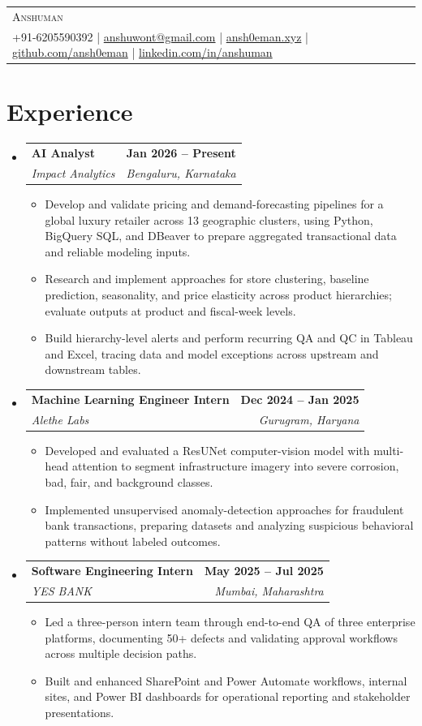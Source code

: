 \documentclass[letterpaper,11pt]{article}
\makeatletter
\newcommand{\resumeItem}[1]{
  \item\small{{#1 \vspace{-2pt}}}
}
\newcommand{\resumeSubheading}[4]{
  \vspace{-2pt}\item
    \begin{tabular*}{1.0\textwidth}[t]{l@{\extracolsep{\fill}}r}
      \textbf{#1} & \textbf{\small #2} \\
      \textit{\small #3} & \textit{\small #4} \\
    \end{tabular*}\vspace{-8pt}
}
\newcommand{\resumeSubHeadingListStart}{\begin{itemize}[leftmargin=0.0in,label={}]}
\newcommand{\resumeSubHeadingListEnd}{\end{itemize}}
\newcommand{\resumeItemListStart}{\begin{itemize}[leftmargin=0.22in]}
\newcommand{\resumeItemListEnd}{\end{itemize}\vspace{-6pt}}
\makeatother
\begin{document}
\begin{tabularx}{\textwidth}{@{}X@{}}
  {\Huge \scshape Anshuman}\\[0.2em]
  +91-6205590392 \;|\;
  \href{mailto:anshuwont@gmail.com}{anshuwont@gmail.com} \;|\;
  \href{https://ansh0eman.in/?utm_source=resume\&utm_medium=pdf\&utm_campaign=job_search\&utm_content=ai_ml_engineer}{ansh0eman.xyz} \;|\;
  \href{https://github.com/ansh0eman}{github.com/ansh0eman} \;|\;
  \href{https://www.linkedin.com/in/anshuman-anshuman-82028b263/}{linkedin.com/in/anshuman}\\[0.15em]
\end{tabularx}

\section{Experience}
\resumeSubHeadingListStart
  \resumeSubheading
    {AI Analyst}{Jan 2026 -- Present}
    {Impact Analytics}{Bengaluru, Karnataka}
    \resumeItemListStart
      \resumeItem{Develop and validate pricing and demand-forecasting pipelines for a global luxury retailer across 13 geographic clusters, using Python, BigQuery SQL, and DBeaver to prepare aggregated transactional data and reliable modeling inputs.}
      \resumeItem{Research and implement approaches for store clustering, baseline prediction, seasonality, and price elasticity across product hierarchies; evaluate outputs at product and fiscal-week levels.}
      \resumeItem{Build hierarchy-level alerts and perform recurring QA and QC in Tableau and Excel, tracing data and model exceptions across upstream and downstream tables.}
    \resumeItemListEnd

  \resumeSubheading
    {Machine Learning Engineer Intern}{Dec 2024 -- Jan 2025}
    {Alethe Labs}{Gurugram, Haryana}
    \resumeItemListStart
      \resumeItem{Developed and evaluated a ResUNet computer-vision model with multi-head attention to segment infrastructure imagery into severe corrosion, bad, fair, and background classes.}
      \resumeItem{Implemented unsupervised anomaly-detection approaches for fraudulent bank transactions, preparing datasets and analyzing suspicious behavioral patterns without labeled outcomes.}
    \resumeItemListEnd

  \resumeSubheading
    {Software Engineering Intern}{May 2025 -- Jul 2025}
    {YES BANK}{Mumbai, Maharashtra}
    \resumeItemListStart
      \resumeItem{Led a three-person intern team through end-to-end QA of three enterprise platforms, documenting 50+ defects and validating approval workflows across multiple decision paths.}
      \resumeItem{Built and enhanced SharePoint and Power Automate workflows, internal sites, and Power BI dashboards for operational reporting and stakeholder presentations.}
    \resumeItemListEnd
\resumeSubHeadingListEnd
\end{document}
